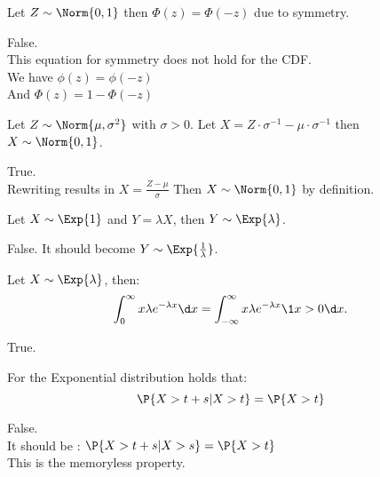 \documentclass[tf-tutorial-all.tex]{subfiles}
\begin{document}
\begin{truefalse}
Let $Z \sim \Norm{0,1}$ then $\Phi(z) = \Phi(-z)$ due to symmetry.
\begin{solution}
False.\\
This equation for symmetry does not hold for the CDF. \\
We have $\phi(z) = \phi(-z)$
\\And $\Phi(z) = 1 - \Phi(-z)$
\end{solution}
\end{truefalse}

\begin{truefalse}
Let $Z \sim \Norm{\mu, \sigma^{2}}$ with $\sigma>0$.
Let $X = Z \cdot \sigma^{-1} - \mu \cdot \sigma^{-1}$ then $X \sim \Norm{0,1}$.
\begin{solution}
True.
\\Rewriting results in $X = \frac{Z - \mu}{\sigma} $ Then $ X \sim \Norm{0,1}$ by definition.
\end{solution}
\end{truefalse}

\begin{truefalse}
Let $X \sim \Exp{1}$ and $Y = \lambda X$, then $Y \sim \Exp{\lambda}$.
\begin{solution}
False. It should become $Y \sim \Exp{\frac{1}{\lambda}}$.
\end{solution}
\end{truefalse}

\begin{truefalse}
Let $X \sim \Exp{\lambda}$, then:
$$ \int^{\infty}_{0} x  \lambda e^{ - \lambda x} \d x  =  \int^{\infty}_{- \infty} x \lambda e^{ - \lambda x} \1{x> 0}\d x.$$
\begin{solution}
True.\\
\end{solution}
\end{truefalse}

\begin{truefalse}
For the Exponential distribution holds that:
$$\P{X > t + s | X > t} = \P{X > t}$$
\begin{solution}
 False.
 \\It should be :
$\P{X > t + s | X > s} = \P{X > t}$
\\This is the memoryless property.
\end{solution}
\end{truefalse}
\end{document}
